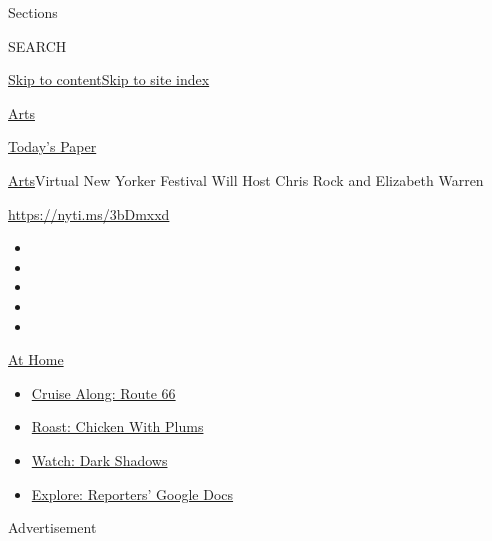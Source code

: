 Sections

SEARCH

\protect\hyperlink{site-content}{Skip to
content}\protect\hyperlink{site-index}{Skip to site index}

\href{https://www.nytimes3xbfgragh.onion/section/arts}{Arts}

\href{https://myaccount.nytimes3xbfgragh.onion/auth/login?response_type=cookie\&client_id=vi}{}

\href{https://www.nytimes3xbfgragh.onion/section/todayspaper}{Today's
Paper}

\href{/section/arts}{Arts}\textbar{}Virtual New Yorker Festival Will
Host Chris Rock and Elizabeth Warren

\url{https://nyti.ms/3bDmxxd}

\begin{itemize}
\item
\item
\item
\item
\item
\end{itemize}

\href{https://www.nytimes3xbfgragh.onion/spotlight/at-home?action=click\&pgtype=Article\&state=default\&region=TOP_BANNER\&context=at_home_menu}{At
Home}

\begin{itemize}
\tightlist
\item
  \href{https://www.nytimes3xbfgragh.onion/2020/09/07/travel/route-66.html?action=click\&pgtype=Article\&state=default\&region=TOP_BANNER\&context=at_home_menu}{Cruise
  Along: Route 66}
\item
  \href{https://www.nytimes3xbfgragh.onion/2020/09/04/dining/sheet-pan-chicken.html?action=click\&pgtype=Article\&state=default\&region=TOP_BANNER\&context=at_home_menu}{Roast:
  Chicken With Plums}
\item
  \href{https://www.nytimes3xbfgragh.onion/2020/09/04/arts/television/dark-shadows-stream.html?action=click\&pgtype=Article\&state=default\&region=TOP_BANNER\&context=at_home_menu}{Watch:
  Dark Shadows}
\item
  \href{https://www.nytimes3xbfgragh.onion/interactive/2020/at-home/even-more-reporters-editors-diaries-lists-recommendations.html?action=click\&pgtype=Article\&state=default\&region=TOP_BANNER\&context=at_home_menu}{Explore:
  Reporters' Google Docs}
\end{itemize}

Advertisement

